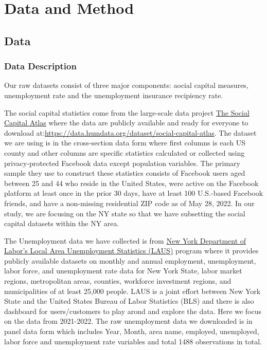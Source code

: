 \documentclass{article}
\begin{document}


\section{Data and Method}

\subsection{Data}

\subsubsection{Data Description}

Our raw datasets consist of three major components: aocial capital measures, unemployment rate and the unemployment insurance recipiency rate.


The social capital statistics come from the large-scale data project \href{https://socialcapital.org}{The Social Capital Atlas} where the data are publicly available and ready for everyone to download at:\url{https://data.humdata.org/dataset/social-capital-atlas}. The dataset we are using is in the cross-section data form where first columns is each US county and other columns are specific statistics calculated or collected using privacy-protected Facebook data except population variables. The primary sample they use to construct these statistics consists of Facebook users aged between 25 and 44 who reside in the United States, were active on the Facebook platform at least once in the prior 30 days, have at least 100 U.S.-based Facebook friends, and have a non-missing residential ZIP code as of May 28, 2022. In our study, we are focusing on the NY state so that we have subsetting the social capital datasets within the NY area.


The Unemployment data we have collected is from \href{https://dol.ny.gov/local-area-unemployment-statistics}{New York Department of Labor's Local Area Unemployment Statistics (LAUS)} program where it provides publicly available datasets on monthly and annual employment, unemployment, labor force, and unemployment rate data for New York State, labor market regions, metropolitan areas, counties, workforce investment regions, and municipalities of at least 25,000 people. LAUS is a joint effort between New York State and the United States Bureau of Labor Statistics (BLS) and there is also dashboard for users/customers to play arond and explore the data. Here we focus on the data from 2021-2022. The raw unemployment data we downloaded is in panel data form which includes Year, Month, area name, employed, unemployed, labor force and unemployment rate variables and total 1488 observations in total. 
\end{document}
